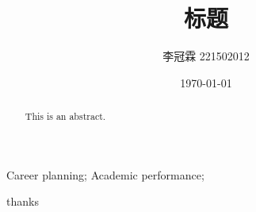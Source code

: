 \documentclass[12pt, a4paper, oneside,UTF8]{ctexart}
\title{标题}
\author{李冠霖 221502012}
\date{\today}
\begin{document}
\maketitle
\tableofcontents
\newpage

\begin{abstract}
    This is an abstract.
\end{abstract}

\begin{keyword}
    Career planning;  %
    Academic performance;  %
\end{keyword}
\newpage
thanks \cite{negru2016longitudinal}



\end{document}

